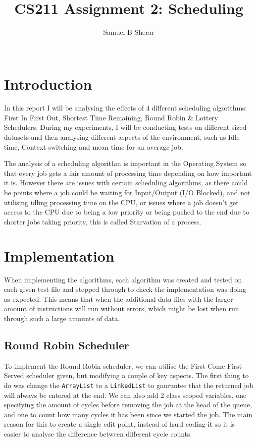 \documentclass{acm_proc_article-sp}
\begin{document}
\title{CS211 Assignment 2: Scheduling}
\author{
  \alignauthor 
  Samuel B Sherar\\
  \
}

\maketitle

\section{Introduction}
In this report I will be analysing the effects of 4 different scheduling algorithms: First In First Out, Shortest Time Remaining, Round Robin \& Lottery Schedulers. During my experiments, I will be conducting tests on different sized datasets and then analysing different aspects of the environment, such as Idle time, Context switching and mean time for an average job.

The analysis of a scheduling algorithm is important in the Operating System so that every job gets a fair amount of processing time depending on how important it is. However there are issues with certain scheduling algorithms, as there could be points where a job could be waiting for Input/Output (I/O Blocked), and not utilising idling processing time on the CPU, or issues where a job doesn't get access to the CPU due to being a low priority or being pushed to the end due to shorter jobs taking priority, this is called Starvation of a process. 

\section{Implementation}

When implementing the algorithms, each algorithm was created and tested on each given test file and stepped through to check the implementation was doing as expected. This means that when the additional data files with the larger amount of instructions will run without errors, which might be lost when run through such a large amounts of data.

\subsection{Round Robin Scheduler}

To implement the Round Robin scheduler, we can utilise the First Come First Served scheduler given, but modifying a couple of key aspects. The first thing to do was change the \texttt{ArrayList} to a \texttt{LinkedList} to gauruntee that the returned job will always be entered at the end. We can also add 2 class scoped variables, one specifying the amount of cycles before removing the job at the head of the queue, and one to count how many cycles it has been since we started the job. The main reason for this to create a single edit point, instead of hard coding it so it is easier to analyse the difference between different cycle counts.
\end{document}
